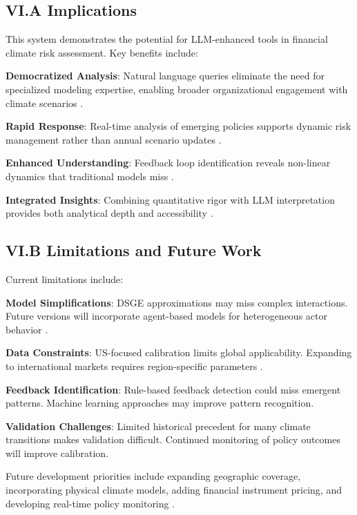 \documentclass[10pt,twocolumn]{article}
\begin{document}
\subsection{VI.A Implications}

This system demonstrates the potential for LLM-enhanced tools in financial climate risk assessment. Key benefits include:

\textbf{Democratized Analysis}: Natural language queries eliminate the need for specialized modeling expertise, enabling broader organizational engagement with climate scenarios \citep{roncalli2021market, sankar2024carbon, wang2022moment}.

\textbf{Rapid Response}: Real-time analysis of emerging policies supports dynamic risk management rather than annual scenario updates \citep{roncoroni2019climate, tabash2024modeling}.

\textbf{Enhanced Understanding}: Feedback loop identification reveals non-linear dynamics that traditional models miss \citep{banerjee2018pricing, tharavanij2021optimal}.

\textbf{Integrated Insights}: Combining quantitative rigor with LLM interpretation provides both analytical depth and accessibility \citep{liu2020research, mcdonnell2023beyond}.

\subsection{VI.B Limitations and Future Work}

Current limitations include:

\textbf{Model Simplifications}: DSGE approximations may miss complex interactions. Future versions will incorporate agent-based models for heterogeneous actor behavior \citep{shobande2022sustainable, sankar2024carbon}.

\textbf{Data Constraints}: US-focused calibration limits global applicability. Expanding to international markets requires region-specific parameters \citep{tabash2024modeling}.

\textbf{Feedback Identification}: Rule-based feedback detection could miss emergent patterns. Machine learning approaches may improve pattern recognition.

\textbf{Validation Challenges}: Limited historical precedent for many climate transitions makes validation difficult. Continued monitoring of policy outcomes will improve calibration.

Future development priorities include expanding geographic coverage, incorporating physical climate models, adding financial instrument pricing, and developing real-time policy monitoring \citep{dunz2021compounding, roncoroni2019climate}.
\end{document}
